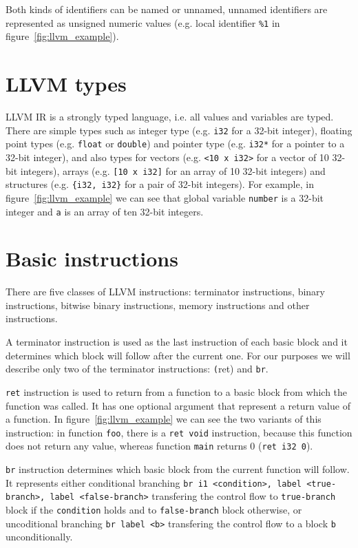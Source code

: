Both kinds of identifiers can be named or unnamed, unnamed identifiers are
represented as unsigned numeric values (e.g. local identifier \texttt{\%1} in
figure~\ref{fig:llvm_example}).

\section{LLVM types}

LLVM IR is a strongly typed language, i.e. all values and variables are typed.
There are simple types such as integer type (e.g. \texttt{i32} for a 32-bit
integer), floating point types (e.g. \texttt{float} or \texttt{double}) and
pointer type (e.g. \texttt{i32*} for a pointer to a 32-bit integer), and also
types for vectors (e.g. \texttt{<10 x i32>} for a vector of 10 32-bit
integers), arrays (e.g. \texttt{[10 x i32]} for an array of 10 32-bit integers)
and structures (e.g. \texttt{\{i32, i32\}} for a pair of 32-bit integers). For
example, in figure~\ref{fig:llvm_example} we can see that global variable
\texttt{number} is a 32-bit integer and \texttt{a} is an array of ten
32-bit integers.

\section{Basic instructions}

There are five classes of LLVM instructions: terminator instructions, binary
instructions, bitwise binary instructions, memory instructions and other
instructions.

A terminator instruction is used as the last instruction of each basic block
and it determines which block will follow after the current one. For our
purposes we will describe only two of the terminator instructions: \texttt(ret)
and \texttt{br}.

\texttt{ret} instruction is used to return from a function to a basic block
from which the function was called. It has one optional argument that represent
a return value of a function. In figure~\ref{fig:llvm_example} we can see the
two variants of this instruction: in function \texttt{foo}, there is a
\texttt{ret void} instruction, because this function does not return any value,
whereas function \texttt{main} returns 0 (\texttt{ret i32 0}).

\texttt{br} instruction determines which basic block from the current function
will follow. It represents either conditional branching \texttt{br i1
<condition>, label <true-branch>, label <false-branch>} transfering the control
flow to \texttt{true-branch} block if the \texttt{condition} holds and to
\texttt{false-branch} block otherwise, or uncoditional branching \texttt{br
label <b>} transfering the control flow to a block \texttt{b} unconditionally.

